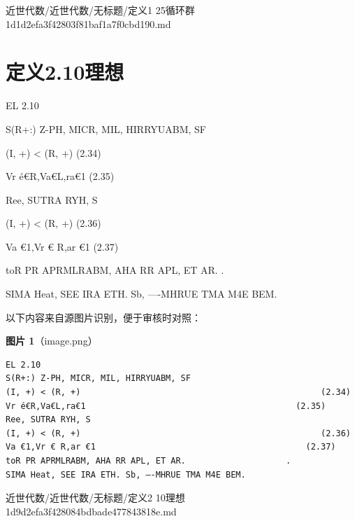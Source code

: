 \begin{note}[来源路径]

近世代数/近世代数/无标题/定义1 25循环群 1d1d2efa3f42803f81baf1a7f0cbd190.md

\end{note}

\section*{定义2.10理想}

\begin{definition}[定义2.10理想]

EL 2.10

S(R+:) Z-PH, MICR, MIL, HIRRYUABM, SF

(I, +) < (R, +)                                                (2.34)

Vr é€R,Va€L,ra€1                                          (2.35)

Ree, SUTRA RYH, S

(I, +) < (R, +)                                                (2.36)

Va €1,Vr € R,ar €1                                          (2.37)

toR PR APRMLRABM, AHA RR APL, ET AR.                    .

SIMA Heat, SEE IRA ETH. Sb, —-MHRUE TMA M4E BEM.

\end{definition}

\begin{note}
以下内容来自源图片识别，便于审核时对照：

\textbf{图片 1}（image.png）
\begin{Verbatim}[fontsize=\small]
EL 2.10
S(R+:) Z-PH, MICR, MIL, HIRRYUABM, SF
(I, +) < (R, +)                                                (2.34)
Vr é€R,Va€L,ra€1                                          (2.35)
Ree, SUTRA RYH, S
(I, +) < (R, +)                                                (2.36)
Va €1,Vr € R,ar €1                                          (2.37)
toR PR APRMLRABM, AHA RR APL, ET AR.                    .
SIMA Heat, SEE IRA ETH. Sb, —-MHRUE TMA M4E BEM.
\end{Verbatim}

\end{note}

\begin{note}[来源路径]

近世代数/近世代数/无标题/定义2 10理想 1d9d2efa3f428084bdbade477843818e.md

\end{note}

